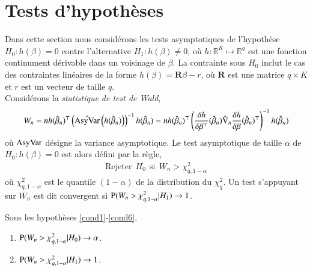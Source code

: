 \documentclass[10pt, reqno]{amsart}
\begin{document}
\section{Tests d'hypothèses}
Dans cette section nous considérons les tests asymptotiques de l'hypothèse $H_0: h(\beta) = 0$ contre l'alternative 
 $H_1: h(\beta) \neq 0$, où $h: \mathbb{R}^K \mapsto \mathbb{R}^q$ est une fonction continument dérivable dans un voisinage de $\beta$. La contrainte sous $H_0$ inclut le cas des contraintes linéaires de la forme $h(\beta) = \mathbf{R}\beta - r$, où $\mathbf{R}$ est une matrice $q\times K$ et $r$ est un vecteur de taille $q$.\\ 
Considérons la \emph{statistique de test de Wald},
\begin{align*}
 W_n = nh(\hat{\beta}_n)^\top \left(\hat{\mathrm{AsyVar}}\left(h(\hat{\beta}_n)\right)\right)^{-1}h(\hat{\beta}_n) = n h(\hat{\beta}_n)^\top\left(\frac{\delta h}{\delta \beta ^ \top}(\hat{\beta}_n)\hat{\operatorname{V}}_n \frac{\delta h}{\delta \beta}(\hat{\beta}_n)^\top \right)^{-1} h(\hat{\beta}_n)
\end{align*}
où $\mathrm{AsyVar}$ désigne la variance asymptotique. Le test asymptotique de taille $\alpha$ de $H_0: h(\beta) = 0$ est alors défini par la règle,
\begin{align*}
\textrm{Rejeter} \ \ H_0 \ \ \textrm{si} \ \ W_n > \chi^2_{q, 1- \alpha}
\end{align*}
où $\chi^2_{q, 1- \alpha}$ est le quantile $(1-\alpha)$ de la distribution du $\chi^2_q$. Un test s'appuyant sur  $W_n$ est dit convergent si $\operatorname{P}(W_n > \chi^2_{q, 1- \alpha} | H_1) \rightarrow 1$.
\begin{propriete}\label{pr3}
Sous les hypothèses \ref{cond1}-\ref{cond6},
\begin{enumerate}
\item\label{pr3a} $\operatorname{P}(W_n > \chi^2_{q, 1- \alpha} | H_0) \rightarrow \alpha$.
\item\label{pr3b} $\operatorname{P}(W_n > \chi^2_{q, 1- \alpha} | H_1) \rightarrow 1$.
\end{enumerate}
\end{propriete}
\end{document}

